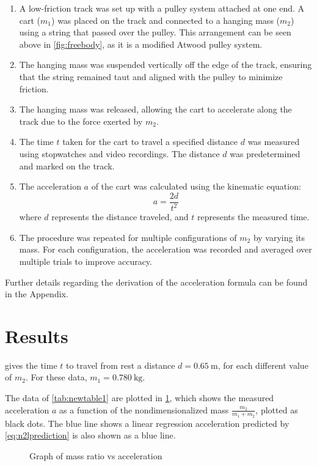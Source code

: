 ﻿\documentclass[reprint,amsmath,amssymb,aps]{revtex4-2}
\begin{document}
\begin{enumerate}
    \item A low-friction track was set up with a pulley system attached at one end. A cart ($m_1$) was placed on the track and connected to a hanging mass ($m_2$) using a string that passed over the pulley. This arrangement can be seen above in \cref{fig:freebody}, as it is a modified Atwood pulley system.
    \item The hanging mass was suspended vertically off the edge of the track, ensuring that the string remained taut and aligned with the pulley to minimize friction.
    \item The hanging mass was released, allowing the cart to accelerate along the track due to the force exerted by $m_2$.
    \item The time $t$ taken for the cart to travel a specified distance $d$ was measured using stopwatches and video recordings. The distance $d$ was predetermined and marked on the track.
    \item The acceleration $a$ of the cart was calculated using the kinematic equation:
\begin{equation}
a = \frac{2d}{t^2}
\end{equation}
    where $d$ represents the distance traveled, and $t$ represents the measured time.
    \item The procedure was repeated for multiple configurations of $m_2$ by varying its mass. For each configuration, the acceleration was recorded and averaged over multiple trials to improve accuracy.
\end{enumerate}

Further details regarding the derivation of the acceleration formula can be found in the Appendix.








\section{Results}
 gives the time $t$ to travel from rest a distance $d=\qty{0.65}{\meter}$, for each different value of $m_2$. For these data, $m_1=\qty{0.780}{\kilo\gram}$. 


The data of \cref{tab:newtable1} are plotted in \cref{fig:graph}, which shows the measured acceleration $a$ as a function of the nondimensionalized mass $\frac{m_2}{m_1+m_2}$, plotted as black dots. The blue line shows a linear regression acceleration predicted by \cref{eq:n2lprediction} is also shown as a blue line. 
\begin{figure}
\begin{center}

\end{center}
\caption{\label{fig:graph} Graph of mass ratio vs acceleration}  
\end{figure}
\end{document}
